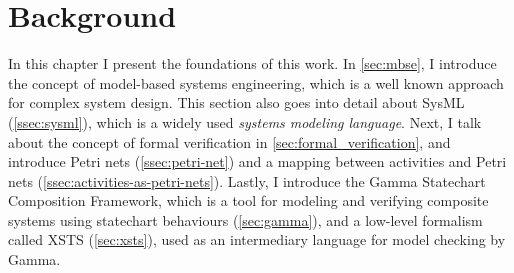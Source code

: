 \chapter{Background}\label{ch:background}

In this chapter I present the foundations of this work. In \autoref{sec:mbse}, I introduce the concept of model-based systems engineering, which is a well known approach for complex system design. This section also goes into detail about SysML (\autoref{ssec:sysml}), which is a widely used \emph{systems modeling language}. Next, I talk about the concept of formal verification in \autoref{sec:formal_verification}, and introduce Petri nets (\autoref{ssec:petri-net}) and a mapping between activities and Petri nets (\autoref{ssec:activities-as-petri-nets}). Lastly, I introduce the Gamma Statechart Composition Framework, which is a tool for modeling and verifying composite systems using statechart behaviours (\autoref{sec:gamma}), and a low-level formalism called XSTS (\autoref{sec:xsts}), used as an intermediary language for model checking by Gamma.


%




